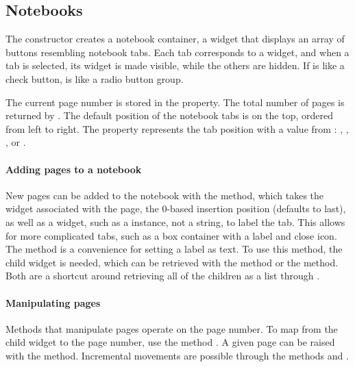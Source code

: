 \subsection{Notebooks}
\label{sec:RGtk2:gtkNotebook}

The  constructor creates a notebook
container, a widget that displays an array of buttons resembling
notebook tabs. Each tab corresponds to a widget, and when a tab is
selected, its widget is made visible, while the others are hidden. If
 is like a check button,  is
like a radio button group. 

The current page number is stored in the  property.  The
total number of pages is returned by .
The default position of the notebook tabs is on the top, ordered from
left to right. The property  represents the tab position
with a value from : , ,
, or .

\paragraph{Adding pages to a notebook}
New pages can be added to the notebook with the
 method, which takes the widget
associated with the page, the $0$-based insertion position (defaults
to last), as well as
a widget, such as a  instance, not a string, to label
the tab. This allows for more complicated tabs, such as a box
container with a label and close icon. The
 method is a convenience for
setting a label as text.  To use this method, the child widget is
needed, which can be retrieved with the \method{[[}{GObject}
method or the  method. Both are a
shortcut around retrieving all of the children as a list through
. 

\paragraph{Manipulating pages}

Methods that manipulate pages operate on the page number. To map from
the child widget to the page number, use the method
.   A given page can be raised with the
 method.  Incremental movements
are possible through the methods  and
.

